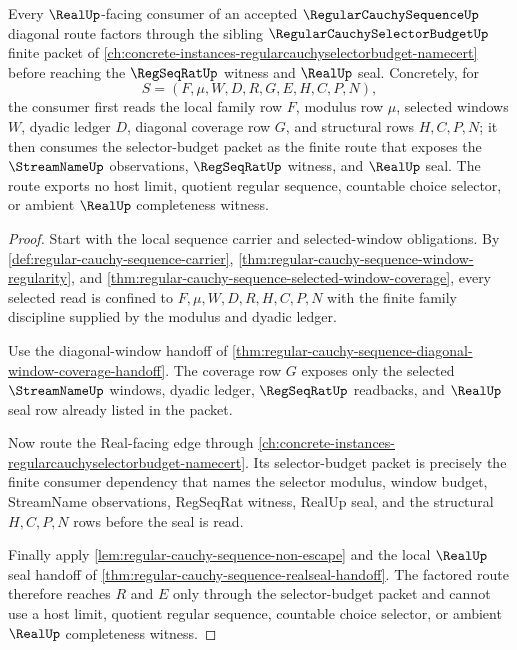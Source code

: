 \begin{theorem}
\label{thm:regular-cauchy-sequence-selector-budget-factor}
Every $\RealUp$-facing consumer of an accepted $\RegularCauchySequenceUp$ diagonal route factors through the sibling $\RegularCauchySelectorBudgetUp$ finite packet of \autoref{ch:concrete-instances-regularcauchyselectorbudget-namecert} before reaching the $\RegSeqRatUp$ witness and $\RealUp$ seal. Concretely, for
$$
S=(F,\mu,W,D,R,G,E,H,C,P,N),
$$
the consumer first reads the local family row $F$, modulus row $\mu$, selected windows $W$, dyadic ledger $D$, diagonal coverage row $G$, and structural rows $H,C,P,N$; it then consumes the selector-budget packet as the finite route that exposes the $\StreamNameUp$ observations, $\RegSeqRatUp$ witness, and $\RealUp$ seal. The route exports no host limit, quotient regular sequence, countable choice selector, or ambient $\RealUp$ completeness witness.
\end{theorem}
\begin{proof}
Start with the local sequence carrier and selected-window obligations. By \autoref{def:regular-cauchy-sequence-carrier}, \autoref{thm:regular-cauchy-sequence-window-regularity}, and \autoref{thm:regular-cauchy-sequence-selected-window-coverage}, every selected read is confined to $F,\mu,W,D,R,H,C,P,N$ with the finite family discipline supplied by the modulus and dyadic ledger.

Use the diagonal-window handoff of \autoref{thm:regular-cauchy-sequence-diagonal-window-coverage-handoff}. The coverage row $G$ exposes only the selected $\StreamNameUp$ windows, dyadic ledger, $\RegSeqRatUp$ readbacks, and $\RealUp$ seal row already listed in the packet.

Now route the Real-facing edge through \autoref{ch:concrete-instances-regularcauchyselectorbudget-namecert}. Its selector-budget packet is precisely the finite consumer dependency that names the selector modulus, window budget, StreamName observations, RegSeqRat witness, RealUp seal, and the structural $H,C,P,N$ rows before the seal is read.

Finally apply \autoref{lem:regular-cauchy-sequence-non-escape} and the local $\RealUp$ seal handoff of \autoref{thm:regular-cauchy-sequence-realseal-handoff}. The factored route therefore reaches $R$ and $E$ only through the selector-budget packet and cannot use a host limit, quotient regular sequence, countable choice selector, or ambient $\RealUp$ completeness witness.
\end{proof}

